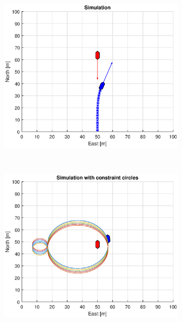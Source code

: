 \begin{figure}[!b]
\begin{subfigure}[b]{0.499\textwidth}
        \centering
        \includegraphics[width=\textwidth]{Images/Figures/Enkel_HO/Simple0_f600_Frame2}
    \end{subfigure}
    \hfill
    \\
    \begin{subfigure}[b]{0.49\textwidth}
        \centering
        \includegraphics[width=\textwidth]{Images/Figures/Enkel_HO/Simple0_f1_Frame3}
    \end{subfigure}
    \hfill
    \begin{subfigure}[b]{0.499\textwidth}

\end{subfigure}
\end{figure}
